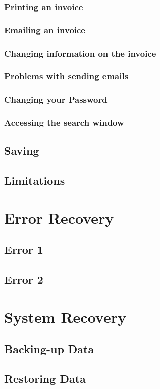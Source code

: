 \subsubsection{Printing an invoice}

\subsubsection{Emailing an invoice}

\subsubsection{Changing information on the invoice}

\subsubsection{Problems with sending emails}

\subsubsection{Changing your Password}

\subsubsection{Accessing the search window}




\subsection{Saving}

\subsection{Limitations}

\section{Error Recovery}

\subsection{Error 1}

\subsection{Error 2}

\section{System Recovery}

\subsection{Backing-up Data}

\subsection{Restoring Data}